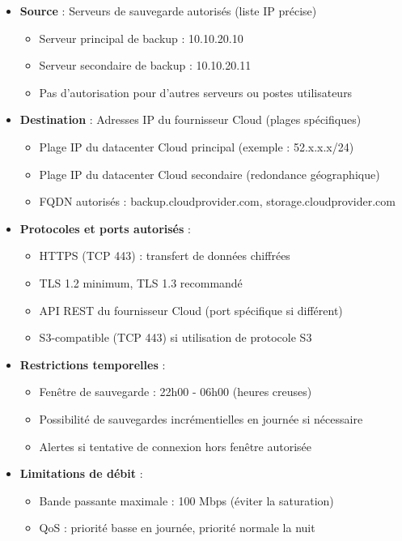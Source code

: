 \begin{itemize}
  \item \textbf{Source} : Serveurs de sauvegarde autorisés (liste IP précise)
  \begin{itemize}
    \item Serveur principal de backup : 10.10.20.10
    \item Serveur secondaire de backup : 10.10.20.11
    \item Pas d'autorisation pour d'autres serveurs ou postes utilisateurs
  \end{itemize}
  
  \item \textbf{Destination} : Adresses IP du fournisseur Cloud (plages spécifiques)
  \begin{itemize}
    \item Plage IP du datacenter Cloud principal (exemple : 52.x.x.x/24)
    \item Plage IP du datacenter Cloud secondaire (redondance géographique)
    \item FQDN autorisés : backup.cloudprovider.com, storage.cloudprovider.com
  \end{itemize}
  
  \item \textbf{Protocoles et ports autorisés} :
  \begin{itemize}
    \item HTTPS (TCP 443) : transfert de données chiffrées
    \item TLS 1.2 minimum, TLS 1.3 recommandé
    \item API REST du fournisseur Cloud (port spécifique si différent)
    \item S3-compatible (TCP 443) si utilisation de protocole S3
  \end{itemize}
  
  \item \textbf{Restrictions temporelles} :
  \begin{itemize}
    \item Fenêtre de sauvegarde : 22h00 - 06h00 (heures creuses)
    \item Possibilité de sauvegardes incrémentielles en journée si nécessaire
    \item Alertes si tentative de connexion hors fenêtre autorisée
  \end{itemize}
  
  \item \textbf{Limitations de débit} :
  \begin{itemize}
    \item Bande passante maximale : 100 Mbps (éviter la saturation)
    \item QoS : priorité basse en journée, priorité normale la nuit
  \end{itemize}
\end{itemize}

